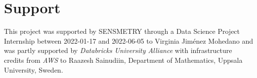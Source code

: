 \chapter{Support} \label{ch:Support}

This project was supported by SENSMETRY through a Data Science Project Internship between 2022-01-17 and 2022-06-05 to Virginia Jim\'enez Mohedano and was partly supported by {\em Databricks University Alliance} with infrastructure credits from {\em AWS} to Raazesh Sainudiin, Department of Mathematics, Uppsala University, Sweden. 
